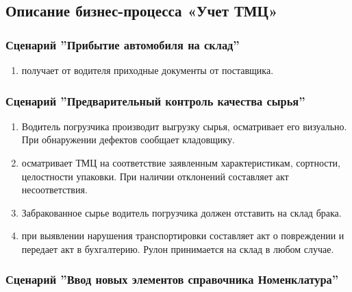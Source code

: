 \newpage
\subsection{Описание бизнес-процесса «Учет ТМЦ»}
\label{bp:storage}

\subsubsection{Сценарий ''Прибытие автомобиля на склад''}
\label{bp:storage_1}


\begin{enumerate}

\item	\kladovshik получает от водителя приходные документы от поставщика.

\end{enumerate}




\subsubsection{Сценарий ''Предварительный контроль качества сырья''}
\label{bp:storage_2}


\begin{enumerate}

\item  Водитель погрузчика производит выгрузку сырья, \kladovshik осматривает его визуально. При обнаружении дефектов сообщает кладовщику.

\item	\kladovshik 
осматривает ТМЦ на соответствие заявленным характеристикам, сортности, целостности упаковки. При наличии отклонений составляет акт несоответствия.

\item Забракованное сырье водитель погрузчика должен отставить на склад брака.

\item \kladovshik при выявлении нарушения транспортировки составляет акт о повреждении и передает акт в бухгалтерию. Рулон принимается на склад в любом случае.
\end{enumerate}


\subsubsection{Сценарий ''Ввод новых элементов справочника Номенклатура''}
\label{bp:storage_4}



